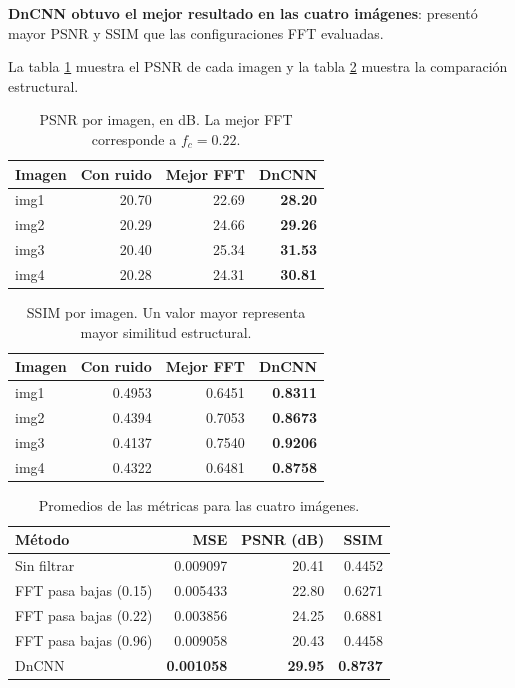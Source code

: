 \documentclass[11pt]{article}
\begin{document}
\textbf{DnCNN obtuvo el mejor resultado en las cuatro
imágenes}: presentó mayor PSNR y SSIM que las configuraciones
FFT evaluadas.

La tabla \ref{tab:cnn-psnr} muestra el PSNR de cada imagen
y la tabla \ref{tab:cnn-ssim} muestra la comparación
estructural.

\begin{table}[H]
\centering

\caption{
    PSNR por imagen, en dB.
    La mejor FFT corresponde a $f_c=0.22$.
}
\label{tab:cnn-psnr}

\begin{tabular}{lrrr}
\hline
\rowcolor{pastelblue}
Imagen & Con ruido & Mejor FFT & DnCNN\\
\hline
img1 & 20.70 & 22.69 & \textbf{28.20}\\
img2 & 20.29 & 24.66 & \textbf{29.26}\\
img3 & 20.40 & 25.34 & \textbf{31.53}\\
img4 & 20.28 & 24.31 & \textbf{30.81}\\
\hline
\end{tabular}
\end{table}

\begin{table}[H]
\centering

\caption{
    SSIM por imagen. Un valor mayor representa mayor
    similitud estructural.
}
\label{tab:cnn-ssim}

\begin{tabular}{lrrr}
\hline
\rowcolor{pastelblue}
Imagen & Con ruido & Mejor FFT & DnCNN\\
\hline
img1 & 0.4953 & 0.6451 & \textbf{0.8311}\\
img2 & 0.4394 & 0.7053 & \textbf{0.8673}\\
img3 & 0.4137 & 0.7540 & \textbf{0.9206}\\
img4 & 0.4322 & 0.6481 & \textbf{0.8758}\\
\hline
\end{tabular}
\end{table}

\begin{table}[H]
\centering

\caption{Promedios de las métricas para las cuatro imágenes.}
\label{tab:cnn-promedios}

\begin{tabular}{lrrr}
\hline
\rowcolor{pastelblue}
Método & MSE & PSNR (dB) & SSIM\\
\hline
Sin filtrar
    & 0.009097 & 20.41 & 0.4452\\
FFT pasa bajas (0.15)
    & 0.005433 & 22.80 & 0.6271\\
FFT pasa bajas (0.22)
    & 0.003856 & 24.25 & 0.6881\\
FFT pasa bajas (0.96)
    & 0.009058 & 20.43 & 0.4458\\
DnCNN
    & \textbf{0.001058}
    & \textbf{29.95}
    & \textbf{0.8737}\\
\hline
\end{tabular}
\end{table}
\end{document}
